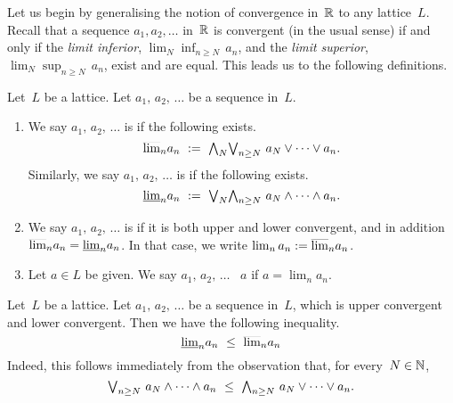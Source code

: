 \documentclass[main.tex]{subfiles}
\begin{document}
%
%
Let us begin by generalising the notion of convergence in~$\mathbb{R}$
to any lattice~$L$.
Recall that a sequence $a_1,a_2,\dotsc$ in~$\mathbb{R}$
is convergent (in the usual sense) if and only if 
the \emph{limit inferior}, $\lim_{N} \inf_{n\geq N}\,a_n$,
and the \emph{limit superior}, $\lim_{N} \sup_{n\geq N}\,a_n$,
exist and are equal.
This leads us to the following definitions.
\begin{dfn}
\label{D:conv}
Let~$L$ be a lattice.
Let $a_1,\,a_2,\,\dotsc$ be a sequence in~$L$.
\begin{enumerate}
\item
We say $a_1,\,a_2,\,\dotsc$ 
is 
if the following exists.
\begin{equation*}
\ulim{n} a_n \ \eqdf\ \bw_N\bv_{n\geq N}\ a_N \vee \dotsb \vee a_n.
\end{equation*}
Similarly,
we say $a_1,\,a_2,\,\dotsc$ is 
if the following exists.
\begin{equation*}
\llim{n} a_n \ \eqdf\ \bv_N\bw_{n\geq N}\ a_N \wedge \dotsb \wedge a_n.
\end{equation*}

\item
We say $a_1,\,a_2,\,\dotsc$ is 
if it is both upper and lower convergent,
and in addition $\smash{\overline{\lim}_{n}}a_n = \smash{\underline{\lim}_{n}}a_n$.
In that case,
we write $\lim_n a_n:=\smash{\overline{\lim}_{n}} a_n$.

\item
Let $a\in L$ be given.
We say $a_1,\,a_2,\,\dotsc$ 
~$a$
if  $a=\lim_n a_n$.
\end{enumerate}
\end{dfn}
%
%
\begin{rem}
\label{R:conv}
Let~$L$ be a lattice.
Let $a_1,\,a_2,\,\dotsc$ be a sequence in~$L$,
which is  upper convergent and lower convergent.
Then we have the following inequality.
\begin{equation*}
\llim{n} a_n \ \leq\ \ulim{n} a_n
\end{equation*}
Indeed,
this follows immediately from the observation
that, for every~$N\in\mathbb{N}$,
\begin{equation*}
\bv_{n\geq N}\ a_N \wedge \dotsb \wedge a_n
\ \leq\ 
\bw_{n\geq N}\ a_N \vee \dotsb \vee a_n.
\end{equation*}
\end{rem}
%
\end{document}
